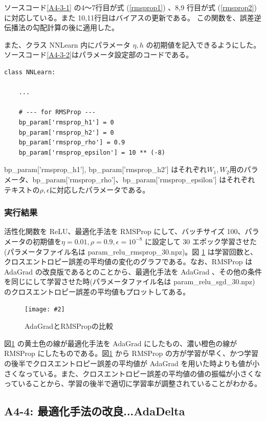 \documentclass[a4paper,dvipdfmx]{jsarticle}
\newcommand{\image}[3]{
    \begin{figure}[H]
        \begin{center}
        \texttt{[image: \#2]}
        \end{center}
        \caption{#1}
        \label{#3}
    \end{figure}
}
\begin{document}
ソースコード\ref{A4-3-1} の4〜7行目が式 (\ref{rmsprop1}) 、8,9 行目が式 (\ref{rmsprop2}) に対応している。また 10,11行目はバイアスの更新である。
この関数を、誤差逆伝播法の勾配計算の後に適用した。

また、クラス NNLearn 内にパラメータ $\eta, h$ の初期値を記入できるようにした。ソースコード\ref{A4-3-2}はパラメータ設定部のコードである。
\begin{lstlisting}[caption="RMSProp のパラメータ設定部",label=A4-3-2]
class NNLearn:

	...
	
    # --- for RMSProp ---
    bp_param['rmsprop_h1'] = 0
    bp_param['rmsprop_h2'] = 0
    bp_param['rmsprop_rho'] = 0.9
    bp_param['rmsprop_epsilon'] = 10 ** (-8)
\end{lstlisting}

bp\_param['rmsprop\_h1'], bp\_param['rmsprop\_h2'] はそれぞれ$W_1, W_2$用のパラメータ、bp\_param['rmsprop\_rho']、bp\_param['rmsprop\_epsilon'] はそれぞれテキストの$\rho, \epsilon$に対応したパラメータである。

\subsubsection*{実行結果}

活性化関数を ReLU、最適化手法を RMSProp にして、バッチサイズ 100、パラメータの初期値を$\eta = 0.01, \rho = 0.9, \epsilon = 10^{-8}$ に設定して 30 エポック学習させた(パラメータファイル名は param\_relu\_rmsprop\_30.npz)。図 \ref{fig-A4-3-1} は学習回数と、クロスエントロピー誤差の平均値の変化のグラフである。なお、RMSProp は AdaGrad の改良版であるとのことから、最適化手法を AdaGrad 、その他の条件を同じにして学習させた時(パラメータファイル名は param\_relu\_sgd\_30.npz)のクロスエントロピー誤差の平均値もプロットしてある。

\image{AdaGradとRMSPropの比較}{report_a4-3.png}{fig-A4-3-1}

図\ref{fig-A4-3-1} の黄土色の線が最適化手法を AdaGrad にしたもの、濃い橙色の線が RMSProp にしたものである。図\ref{fig-A4-3-1} から RMSProp の方が学習が早く、かつ学習の後半でクロスエントロピー誤差の平均値が AdaGrad を用いた時よりも値が小さくなっている。また、クロスエントロピー誤差の平均値の値の振幅が小さくなっていることから、学習の後半で適切に学習率が調整されていることがわかる。

\subsection*{A4-4: 最適化手法の改良...AdaDelta}
\end{document}
